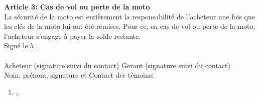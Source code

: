 \documentclass[12pt]{article}
\begin{document}
\textbf{Article 3: Cas de vol ou perte de la moto} \\
La sécurité de la moto est entièrement la responsabilité de l’acheteur une fois que les clés de la moto lui ont été remises. Pour ce, en cas de vol ou perte de la moto, l’acheteur s'engage à payer la solde restante.\\
Signé le  à \underline{\hspace{5cm}}. \\


\hspace{3cm}  \hspace{5cm} \hspace{5cm} \\
Acheteur (signature suivi du contact) \hspace{3cm} Gerant (signature suivi du contact) \\
Nom, prénom, signature et Contact des témoins: 
\begin{enumerate}
		\item \hspace{5cm} ,  
\end{enumerate}
\end{document}
